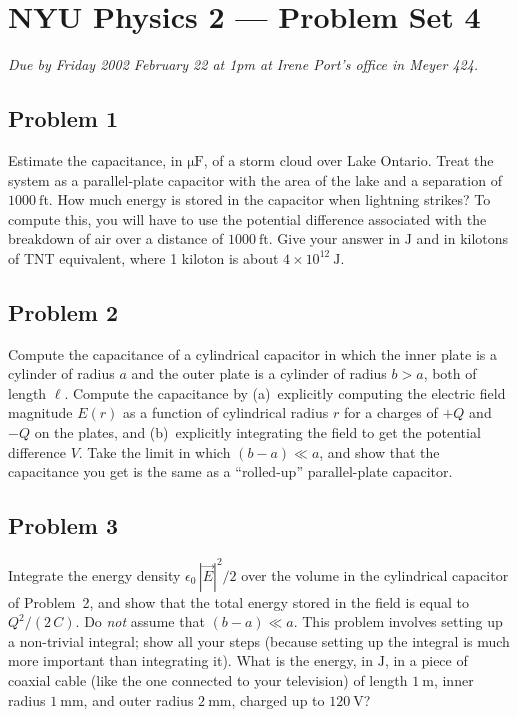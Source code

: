 \documentclass{article}
\begin{document}
\thispagestyle{empty}
\section*{NYU Physics 2 --- Problem Set 4}

\emph{Due by Friday 2002 February 22 at 1pm at Irene Port's office in
Meyer 424.}

\subsection*{Problem 1}

Estimate the capacitance, in $\mathrm{\mu F}$, of a storm cloud over
Lake Ontario.  Treat the system as a parallel-plate capacitor with the
area of the lake and a separation of $1000~\mathrm{ft}$.  How much
energy is stored in the capacitor when lightning strikes?  To compute
this, you will have to use the potential difference associated with
the breakdown of air over a distance of $1000~\mathrm{ft}$.  Give your
answer in $\mathrm{J}$ and in kilotons of TNT equivalent, where 1
kiloton is about $4\times 10^{12}~\mathrm{J}$.

\subsection*{Problem 2}

Compute the capacitance of a cylindrical capacitor in which the inner
plate is a cylinder of radius $a$ and the outer plate is a cylinder of
radius $b>a$, both of length $\ell$.  Compute the capacitance by
(a)~explicitly computing the electric field magnitude $E(r)$ as a
function of cylindrical radius $r$ for a charges of $+Q$ and $-Q$ on
the plates, and (b)~explicitly integrating the field to get the
potential difference $V$.  Take the limit in which $(b-a)\ll a$, and
show that the capacitance you get is the same as a ``rolled-up''
parallel-plate capacitor.

\subsection*{Problem 3}

Integrate the energy density $\epsilon_0\,|\vec{E}|^2/2$ over the
volume in the cylindrical capacitor of Problem~2, and show that the
total energy stored in the field is equal to $Q^2/(2\,C)$.  Do
\emph{not} assume that $(b-a)\ll a$.  This problem involves setting up
a non-trivial integral; show all your steps (because setting up the
integral is much more important than integrating it).  What is the
energy, in $\mathrm{J}$, in a piece of coaxial cable (like the one connected to
your television) of length $1~\mathrm{m}$, inner radius
$1~\mathrm{mm}$, and outer radius $2~\mathrm{mm}$, charged up to
$120~\mathrm{V}$?
\end{document}
